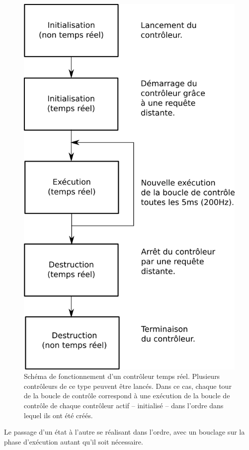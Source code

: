 \begin{figure}
  \begin{center}
    \includegraphics[width=.9\linewidth]{src/chap4-integration/controleur.png}
  \end{center}
  \caption{Schéma de fonctionnement d'un contrôleur temps
    réel. Plusieurs contrôleurs de ce type peuvent être lancés. Dans
    ce cas, chaque tour de la boucle de contrôle correspond à une
    exécution de la boucle de contrôle de chaque contrôleur actif --
    initialisé -- dans l'ordre dans lequel ils ont été créés. \label{fig:controleur}}
\end{figure}

Le passage d'un état à l'autre se réalisant dans l'ordre, avec un
bouclage sur la phase d'exécution autant qu'il soit nécessaire.


